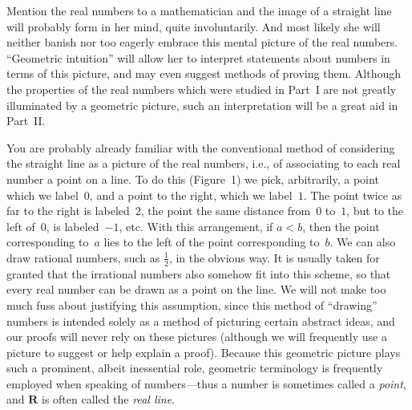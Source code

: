 

Mention the real numbers to a mathematician and the image of a straight line
will probably form in her mind, quite involuntarily. And most likely she will
neither banish nor too eagerly embrace this mental picture of the real numbers.
``Geometric intuition'' will allow her to interpret statements about numbers in
terms of this picture, and may even suggest methods of proving them. Although
the properties of the real numbers which were studied in Part~I are not greatly
illuminated by a geometric picture, such an interpretation will be a great aid
in Part~II.

You are probably already familiar with the conventional method of considering
the straight line as a picture of the real numbers, i.e., of associating to each
real number a point on a line. To do this (Figure~1) we pick, arbitrarily, a
point which we label~$0$, and a point to the right, which we label~$1$. The
point twice as far to the right is labeled~$2$, the point the same distance
from~$0$ to~$1$, but to the left of~$0$, is labeled~$-1$, etc. With this
arrangement, if $a<b$, then the point corresponding to~$a$ lies to the left of
the point corresponding to~$b$. We can also draw rational numbers, such as
$\frac12$, in the obvious way. It is usually taken for granted that the
irrational numbers also somehow fit into this scheme, so that every real number
can be drawn as a point on the line. We will not make too much fuss about
justifying this assumption, since this method of ``drawing'' numbers is
intended solely as a method of picturing certain abstract ideas, and our proofs
will never rely on these pictures (although we will frequently use a picture to
suggest or help explain a proof). Because this geometric picture plays such a
prominent, albeit inessential role, geometric terminology is frequently
employed when speaking of numbers---thus a number is sometimes called a
\emph{point}, and $\mathbf{R}$ is often called the \emph{real line}.

\begin{center}
\\[0.6em]
\end{center}

